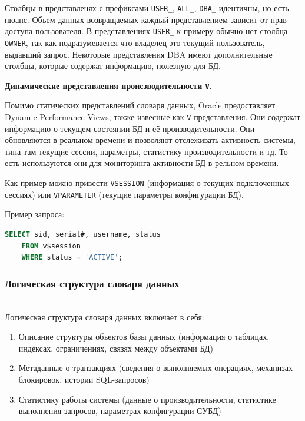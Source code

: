 \begin{enumerate}
\begin{enumerate}
    \end{enumerate}

    Столбцы в представленях с префиксами \texttt{USER\_}, \texttt{ALL\_}, \texttt{DBA\_} идентичны, но есть нюанс. Объем данных возвращаемых каждый представлением зависит от прав доступа пользователя. В представлениях \texttt{USER\_} к примеру обычно нет столбца \texttt{OWNER}, так как подразумевается что владелец это текущий пользователь, выдавший запрос. Некоторые представления DBA имеют дополнительные столбцы, которые содержат информацию, полезную для БД.

    \textbf{Динамические представления происзводительности \texttt{V\textdollar}}. \autocite{oracledbdoc2}

    Помимо статических представлений словаря данных, Oracle предоставляет Dynamic Performance Views, также извесные как \texttt{V\textdollar}-представления. Они содержат информацию о текущем состоянии БД и её производительности. Они обновляются в реальном времени и позволяют отслеживать активность системы, типа там текущие сессии, параметры, статистику производительности и тд. То есть используются они для мониторинга активности БД в рельном времени.

    Как пример можно привести \texttt{V\textdollar SESSION} (информация о текущих подключенных сессиях) или \texttt{V\textdollar PARAMETER} (текущие параметры конфигурации БД).

    Пример запроса:
    \begin{lstlisting}[language=SQL]
    SELECT sid, serial#, username, status 
    FROM v$session 
    WHERE status = 'ACTIVE';
    \end{lstlisting}
    
\end{enumerate}

\subsubsection{Логическая структура словаря данных} ~\\

Логическая структура словаря данных \autocite{PostgreSQLdocc51,ElmasriNavathe,Silberschatz} включает в себя:

\begin{enumerate}
    \item Описание структуры объектов базы данных (информация о таблицах, индексах, ограничениях, связях между объектами БД)
    \item Метаданные о транзакциях (сведения о выполняемых операциях, механизах блокировок, истории SQL-запросов)
    \item Статистику работы системы (данные о производительности, статистике выполнения запросов, параметрах конфигурации СУБД)
\end{enumerate}

